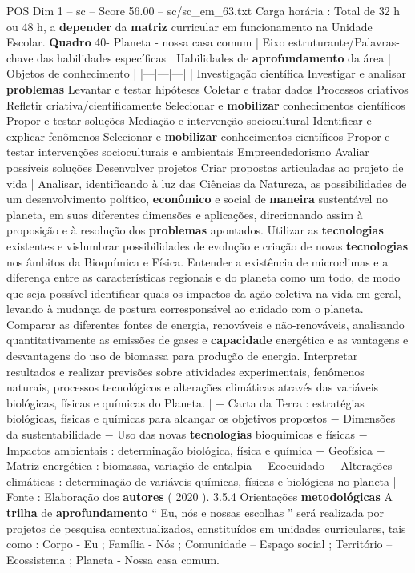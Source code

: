 \begin{textsample}{POS Dim 1 – sc – Score 56.00 – sc/sc\_em\_63.txt}
Carga horária : Total de 32 h ou 48 h, a \textbf{depender} da \textbf{matriz} curricular em funcionamento na Unidade Escolar. \textbf{Quadro} 40- Planeta - nossa casa comum | Eixo estruturante/Palavras-chave das habilidades específicas | Habilidades de \textbf{aprofundamento} da área | Objetos de conhecimento | |---|---|---| | Investigação científica Investigar e analisar \textbf{problemas} Levantar e testar hipóteses Coletar e tratar dados Processos criativos Refletir criativa/cientificamente Selecionar e \textbf{mobilizar} conhecimentos científicos Propor e testar soluções Mediação e intervenção sociocultural Identificar e explicar fenômenos Selecionar e \textbf{mobilizar} conhecimentos científicos Propor e testar intervenções socioculturais e ambientais Empreendedorismo Avaliar possíveis soluções Desenvolver projetos Criar propostas articuladas ao projeto de vida | Analisar, identificando à luz das Ciências da Natureza, as possibilidades de um desenvolvimento político, \textbf{econômico} e social de \textbf{maneira} sustentável no planeta, em suas diferentes dimensões e aplicações, direcionando assim à proposição e à resolução dos \textbf{problemas} apontados.
Utilizar as \textbf{tecnologias} existentes e vislumbrar possibilidades de evolução e criação de novas \textbf{tecnologias} nos âmbitos da Bioquímica e Física.
Entender a existência de microclimas e a diferença entre as características regionais e do planeta como um todo, de modo que seja possível identificar quais os impactos da ação coletiva na vida em geral, levando à mudança de postura corresponsável ao cuidado com o planeta.
Comparar as diferentes fontes de energia, renováveis e não-renováveis, analisando quantitativamente as emissões de gases e \textbf{capacidade} energética e as vantagens e desvantagens do uso de biomassa para produção de energia.
Interpretar resultados e realizar previsões sobre atividades experimentais, fenômenos naturais, processos tecnológicos e alterações climáticas através das variáveis biológicas, físicas e químicas do Planeta. | − Carta da Terra : estratégias biológicas, físicas e químicas para alcançar os objetivos propostos − Dimensões da sustentabilidade − Uso das novas \textbf{tecnologias} bioquímicas e físicas − Impactos ambientais : determinação biológica, física e química − Geofísica − Matriz energética : biomassa, variação de entalpia − Ecocuidado − Alterações climáticas : determinação de variáveis químicas, físicas e biológicas no planeta | Fonte : Elaboração dos \textbf{autores} ( 2020 ). 3.5.4 Orientações \textbf{metodológicas} A \textbf{trilha} de \textbf{aprofundamento} “ Eu, nós e nossas escolhas ” será realizada por projetos de pesquisa contextualizados, constituídos em unidades curriculares, tais como : Corpo - Eu ; Família - Nós ; Comunidade – Espaço social ; Território – Ecossistema ; Planeta - Nossa casa comum.

\end{textsample}
